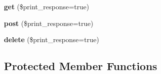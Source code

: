 \begin{DoxyCompactItemize}
\item 
\hypertarget{class_upload_handler_a0a331b917926812f7b7e8ac17e818b8f}{{\bfseries get} (\$print\-\_\-response=true)}\label{class_upload_handler_a0a331b917926812f7b7e8ac17e818b8f}

\item 
\hypertarget{class_upload_handler_abfd28579efb9c71bf4a7ce99c9ffba2a}{{\bfseries post} (\$print\-\_\-response=true)}\label{class_upload_handler_abfd28579efb9c71bf4a7ce99c9ffba2a}

\item 
\hypertarget{class_upload_handler_ac5e612121fb999f225cb5db1b6f72cf6}{{\bfseries delete} (\$print\-\_\-response=true)}\label{class_upload_handler_ac5e612121fb999f225cb5db1b6f72cf6}

\end{DoxyCompactItemize}
\subsection*{Protected Member Functions}
